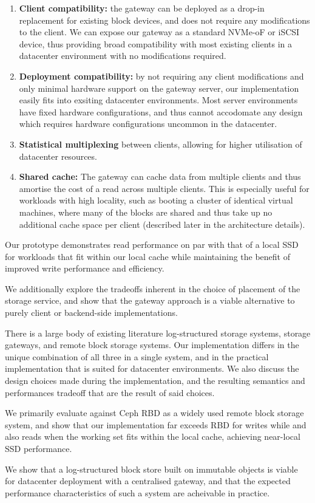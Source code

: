 \begin{enumerate}

  \item \textbf{Client compatibility:} the gateway can be deployed as a drop-in
        replacement for existing block devices, and does not require any modifications
        to the client. We can expose our gateway as a standard NVMe-oF or iSCSI
        device, thus providing broad compatibility with most existing clients in a
        datacenter environment with no modifications required.

  \item \textbf{Deployment compatibility:} by not requiring any client
        modifications and only minimal hardware support on the gateway server, our
        implementation easily fits into exsiting datacenter environments. Most
        server environments have fixed hardware configurations, and thus cannot
        accodomate any design which requires hardware configurations uncommon
        in the datacenter.

  \item \textbf{Statistical multiplexing} between clients, allowing for higher
        utilisation of datacenter resources.

  \item \textbf{Shared cache:} The gateway can cache data from multiple clients
        and thus amortise the cost of a read across multiple clients. This is
        especially useful for workloads with high locality, such as booting a cluster
        of identical virtual machines, where many of the blocks are shared and thus
        take up no additional cache space per client (described later in the
        architecture details).

\end{enumerate}

Our prototype demonstrates read performance on par with that of a local SSD for
workloads that fit within our local cache while maintaining the benefit of
improved write performance and efficiency.

We additionally explore the tradeoffs inherent in the choice of placement of
the storage service, and show that the gateway approach is a viable alternative
to purely client or backend-side implementations.

There is a large body of existing literature log-structured storage systems,
storage gateways, and remote block storage systems. Our implementation differs
in the unique combination of all three in a single system, and in the practical
implementation that is suited for datacenter environments. We also discuss the
design choices made during the implementation, and the resulting semantics and
performances tradeoff that are the result of said choices.

We primarily evaluate against Ceph RBD as a widely used remote block storage
system, and show that our implementation far exceeds RBD for writes while
and also reads when the working set fits within the local cache, achieving
near-local SSD performance.

We show that a log-structured block store built on immutable objects is viable
for datacenter deployment with a centralised gateway, and that the expected
performance characteristics of such a system are acheivable in practice.
